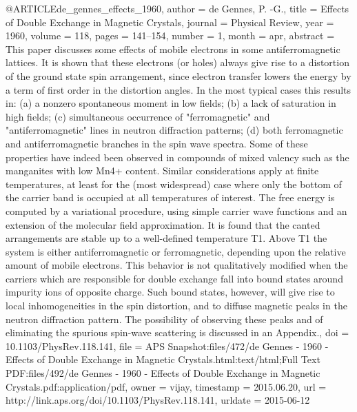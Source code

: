 @ARTICLE{de_gennes_effects_1960,
  author = {de Gennes, P. -G.},
  title = {Effects of {Double} {Exchange} in {Magnetic} {Crystals}},
  journal = {Physical Review},
  year = {1960},
  volume = {118},
  pages = {141--154},
  number = {1},
  month = apr,
  abstract = {This paper discusses some effects of mobile electrons in some antiferromagnetic
	lattices. It is shown that these electrons (or holes) always give
	rise to a distortion of the ground state spin arrangement, since
	electron transfer lowers the energy by a term of first order in the
	distortion angles. In the most typical cases this results in: (a)
	a nonzero spontaneous moment in low fields; (b) a lack of saturation
	in high fields; (c) simultaneous occurrence of "ferromagnetic" and
	"antiferromagnetic" lines in neutron diffraction patterns; (d) both
	ferromagnetic and antiferromagnetic branches in the spin wave spectra.
	Some of these properties have indeed been observed in compounds of
	mixed valency such as the manganites with low Mn4+ content. Similar
	considerations apply at finite temperatures, at least for the (most
	widespread) case where only the bottom of the carrier band is occupied
	at all temperatures of interest. The free energy is computed by a
	variational procedure, using simple carrier wave functions and an
	extension of the molecular field approximation. It is found that
	the canted arrangements are stable up to a well-defined temperature
	T1. Above T1 the system is either antiferromagnetic or ferromagnetic,
	depending upon the relative amount of mobile electrons. This behavior
	is not qualitatively modified when the carriers which are responsible
	for double exchange fall into bound states around impurity ions of
	opposite charge. Such bound states, however, will give rise to local
	inhomogeneities in the spin distortion, and to diffuse magnetic peaks
	in the neutron diffraction pattern. The possibility of observing
	these peaks and of eliminating the spurious spin-wave scattering
	is discussed in an Appendix.},
  doi = {10.1103/PhysRev.118.141},
  file = {APS Snapshot:files/472/de Gennes - 1960 - Effects of Double Exchange in Magnetic Crystals.html:text/html;Full Text PDF:files/492/de Gennes - 1960 - Effects of Double Exchange in Magnetic Crystals.pdf:application/pdf},
  owner = {vijay},
  timestamp = {2015.06.20},
  url = {http://link.aps.org/doi/10.1103/PhysRev.118.141},
  urldate = {2015-06-12}
}

